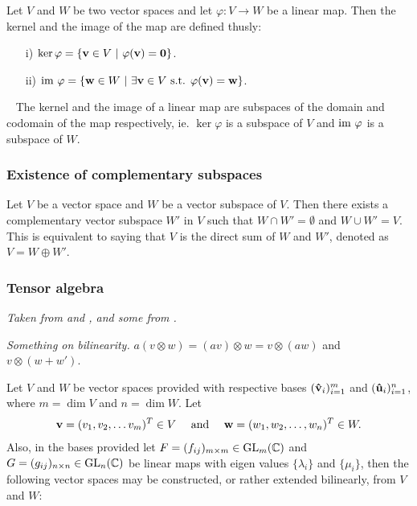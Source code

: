 	\begin{definition}\label{def:kernelimage}
		Let $V$ and $W$ be two vector spaces and let $\varphi: V \rightarrow W$ be a linear map. Then the kernel and the image of the map are defined thusly:
		\begin{itemize}
			\item[i)] $\ker \varphi = \left\lbrace \mathbf{v} \in V \ \middle\vert \ \varphi(\mathbf{v}) = \mathbf{0} \right\rbrace$.
			\item[ii)] $\text{im } \varphi = \left\lbrace \mathbf{w} \in W \ \middle\vert \ \exists \mathbf{v} \in V \text{ s.t. } \varphi(\mathbf{v}) = \mathbf{w} \right\rbrace$.
		\end{itemize}
	\end{definition}
	
	\begin{remark}~\cite[Sect.5.4.]{Holst}
		The kernel and the image of a linear map are subspaces of the domain and codomain of the map respectively, ie. $\ker \varphi$ is a subspace of $V$ and $\text{im } \varphi$ is a subspace of $W$.
	\end{remark}
	
	\subsubsection{Existence of complementary subspaces}
	
	\begin{theorem}\label{thm:compsubspaces}\cite[Thm.12.16]{Holst}
		Let $V$ be a vector space and $W$ be a vector subspace of $V$. Then there exists a complementary vector subspace $W'$ in $V$ such that $W \cap W' = \emptyset$ and $W \cup W' = V$. This is equivalent to saying that $V$ is the direct sum of $W$ and $W'$, denoted as $V = W \oplus W'$.
	\end{theorem}

	
	\subsubsection{Tensor algebra}\label{sect:tensoralgebra}
	
		\textit{Taken from \cite{Jeevanjee} and \cite{Yokonuma}, and some from \cite{Holst}.}
		
		\textit{Something on bilinearity.} $a(v\otimes w) = (av)\otimes w = v \otimes (aw)$ and $v \otimes (w + w')$.

		Let $V$ and $W$ be vector spaces provided with respective bases $(\mathbf{\hat{v}}_i)_{i=1}^m$ and $(\mathbf{\hat{u}}_i)_{i=1}^n$, where $m = \dim V$ and $n = \dim W$. Let \begin{align*}
			\mathbf{v} = (v_1, v_2, \dots v_m)^T \in V
		\quad \text{ and } \quad 
		\mathbf{w} = (w_1, w_2, \dots, w_n)^T \in W.
	\end{align*}
	Also, in the bases provided let $F=(f_{ij})_{m \times m} \in \text{GL}_m(\mathbb{C})$ and $G = (g_{ij})_{n \times n} \in \text{GL}_n(\mathbb{C})$ be linear maps with eigen values $\{\lambda_i\}$ and $\{\mu_i\}$, then the following vector spaces may be constructed, or rather extended bilinearly, from $V$ and $W$:
		
